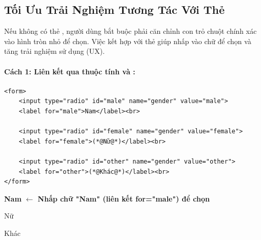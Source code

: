 \subsection{Tối Ưu Trải Nghiệm Tương Tác Với Thẻ }

Nếu không có thẻ , người dùng bắt buộc phải căn chỉnh con trỏ chuột chính xác vào hình tròn nhỏ để chọn. Việc kết hợp với thẻ  giúp nhấp vào chữ để chọn và tăng trải nghiệm sử dụng (UX).

\paragraph{Cách 1: Liên kết qua thuộc tính  và :}
\begin{codeWindow}
\begin{lstlisting}[language=HTML5]
<form>
    <input type="radio" id="male" name="gender" value="male">
    <label for="male">Nam</label><br>
    
    <input type="radio" id="female" name="gender" value="female">
    <label for="female">(*@Nữ@*)</label><br>
    
    <input type="radio" id="other" name="gender" value="other">
    <label for="other">(*@Khác@*)</label><br>
</form>
\end{lstlisting}
\end{codeWindow}

\begin{browserWindow}[Mô Phỏng Trình Duyệt: Tương Tác Chọn Radio Qua Thẻ Label (Liên kết for=id)]
\sffamily\small
{} \; \textbf{Nam} \quad \textcolor{primaryBlue}{\small\textbf{$\leftarrow$ Nhấp chữ "Nam" (liên kết for="male") để chọn}} \\[4pt]
 \; Nữ \\[4pt]
 \; Khác
\end{browserWindow}

